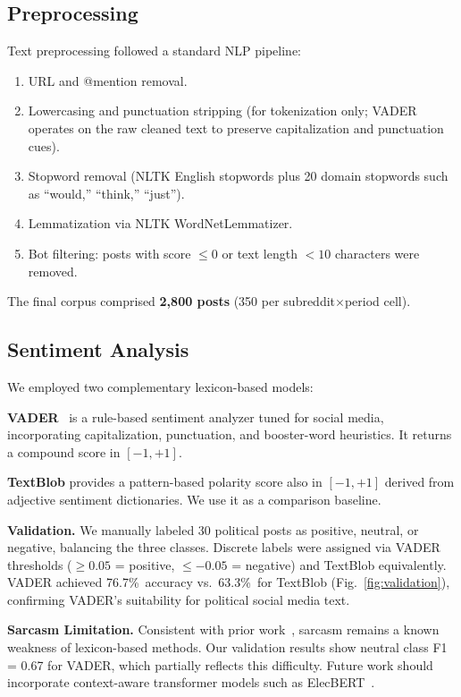 \documentclass[journal]{IEEEtran}
\begin{document}
\subsection{Preprocessing}

Text preprocessing followed a standard NLP pipeline:
\begin{enumerate}
  \item URL and @mention removal.
  \item Lowercasing and punctuation stripping (for tokenization only;
        VADER operates on the raw cleaned text to preserve
        capitalization and punctuation cues).
  \item Stopword removal (NLTK English stopwords plus 20 domain
        stopwords such as ``would,'' ``think,'' ``just'').
  \item Lemmatization via NLTK WordNetLemmatizer.
  \item Bot filtering: posts with score $\leq 0$ or text length
        $< 10$ characters were removed.
\end{enumerate}
The final corpus comprised \textbf{2,800 posts} (350 per
subreddit$\times$period cell).

\subsection{Sentiment Analysis}

We employed two complementary lexicon-based models:

\textbf{VADER}~\cite{hutto2014vader} is a rule-based sentiment
analyzer tuned for social media, incorporating capitalization,
punctuation, and booster-word heuristics. It returns a compound score
in $[-1, +1]$.

\textbf{TextBlob} provides a pattern-based polarity score also in
$[-1, +1]$ derived from adjective sentiment dictionaries. We use it
as a comparison baseline.

\textbf{Validation.}
We manually labeled 30 political posts as positive, neutral, or
negative, balancing the three classes. Discrete labels were assigned
via VADER thresholds ($\geq 0.05$ = positive, $\leq -0.05$ = negative)
and TextBlob equivalently. VADER achieved 76.7\%\ accuracy vs.\ 63.3\%\
for TextBlob (Fig.~\ref{fig:validation}), confirming VADER's suitability
for political social media text.

\textbf{Sarcasm Limitation.}
Consistent with prior work~\cite{hutto2014vader,chaudhry2021sentiment},
sarcasm remains a known weakness of lexicon-based methods. Our
validation results show neutral class F1 = 0.67 for VADER, which
partially reflects this difficulty. Future work should incorporate
context-aware transformer models such as ElecBERT~\cite{khan2023improving}.
\end{document}
